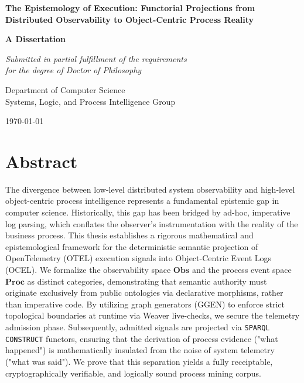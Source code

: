 \documentclass[12pt,a4paper,oneside]{book}
\begin{document}
\frontmatter

\begin{titlepage}
    \begin{center}
        \vspace*{1cm}
        
        \Huge
        \textbf{The Epistemology of Execution: Functorial Projections from Distributed Observability to Object-Centric Process Reality}
        
        \vspace{1.5cm}
        
        \Large
        \textbf{A Dissertation}
        
        \vspace{1.5cm}
        
        \textit{Submitted in partial fulfillment of the requirements \\ for the degree of Doctor of Philosophy}
        
        \vspace{2cm}
        
        \Large
        Department of Computer Science \\
        Systems, Logic, and Process Intelligence Group
        
        \vspace{1.5cm}
        
        \today
        
    \end{center}
\end{titlepage}

\chapter*{Abstract}
The divergence between low-level distributed system observability and high-level object-centric process intelligence represents a fundamental epistemic gap in computer science. Historically, this gap has been bridged by ad-hoc, imperative log parsing, which conflates the observer's instrumentation with the reality of the business process. This thesis establishes a rigorous mathematical and epistemological framework for the deterministic semantic projection of OpenTelemetry (OTEL) execution signals into Object-Centric Event Logs (OCEL). We formalize the observability space $\mathbf{Obs}$ and the process event space $\mathbf{Proc}$ as distinct categories, demonstrating that semantic authority must originate exclusively from public ontologies via declarative morphisms, rather than imperative code. By utilizing graph generators (GGEN) to enforce strict topological boundaries at runtime via Weaver live-checks, we secure the telemetry admission phase. Subsequently, admitted signals are projected via \texttt{SPARQL CONSTRUCT} functors, ensuring that the derivation of process evidence ("what happened") is mathematically insulated from the noise of system telemetry ("what was said"). We prove that this separation yields a fully receiptable, cryptographically verifiable, and logically sound process mining corpus.
\end{document}

